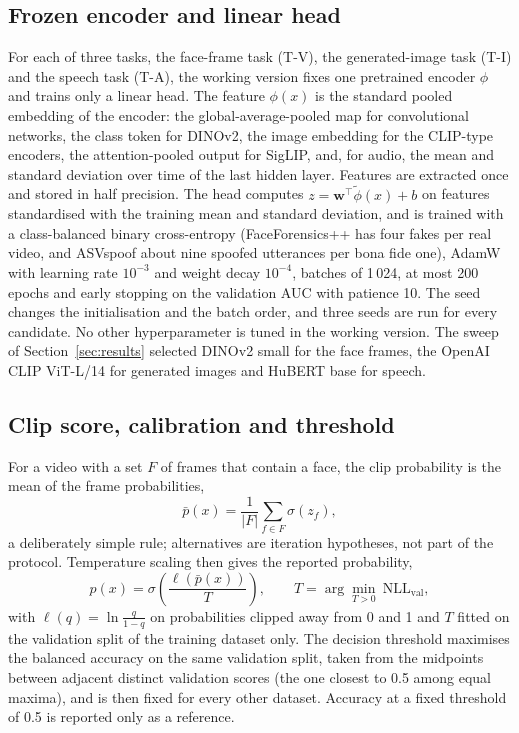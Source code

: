 \documentclass[conference,a4paper]{IEEEtran_nodash}
\newcommand{\sigmoid}{\sigma}
\begin{document}
\subsection{Frozen encoder and linear head}
For each of three tasks, the face-frame task (T-V), the generated-image task
(T-I) and the speech task (T-A), the working version fixes one pretrained
encoder $\phi$ and trains only a linear head. The feature $\phi(x)$ is the
standard pooled embedding of the encoder: the global-average-pooled map for
convolutional networks, the class token for DINOv2, the image embedding for the
CLIP-type encoders, the attention-pooled output for SigLIP, and, for audio, the
mean and standard deviation over time of the last hidden layer. Features are
extracted once and stored in half precision. The head computes
$z=\mathbf{w}^{\top}\tilde{\phi}(x)+b$ on features standardised with the
training mean and standard deviation, and is trained with a class-balanced
binary cross-entropy (FaceForensics++ has four fakes per real video, and
ASVspoof about nine spoofed utterances per bona fide one), AdamW with learning
rate $10^{-3}$ and weight decay $10^{-4}$, batches of 1\,024, at most 200
epochs and early stopping on the validation AUC with patience 10. The seed
changes the initialisation and the batch order, and three seeds are run for
every candidate. No other hyperparameter is tuned in the working version. The sweep of
Section~\ref{sec:results} selected DINOv2 small for the face frames, the OpenAI
CLIP ViT-L/14 for generated images and HuBERT base for speech.

\subsection{Clip score, calibration and threshold}
For a video with a set $F$ of frames that contain a face, the clip probability
is the mean of the frame probabilities,
\begin{equation}
\bar p(x)=\frac{1}{|F|}\sum_{f\in F}\sigmoid(z_f),
\end{equation}
a deliberately simple rule; alternatives are iteration hypotheses, not part of
the protocol. Temperature scaling then gives the reported probability,
\begin{equation}
p(x)=\sigmoid\!\left(\frac{\ell(\bar p(x))}{T}\right),\qquad
T=\arg\min_{T>0}\ \mathrm{NLL}_{\mathrm{val}},
\end{equation}
with $\ell(q)=\ln\frac{q}{1-q}$ on probabilities clipped away from 0 and 1
and $T$ fitted on the validation split of the training dataset only. The
decision threshold maximises the balanced accuracy on the same validation
split, taken from the midpoints between adjacent distinct validation scores
(the one closest to 0.5 among equal maxima), and is then fixed for every other
dataset. Accuracy at a fixed threshold of 0.5 is reported only as a reference.
\end{document}
